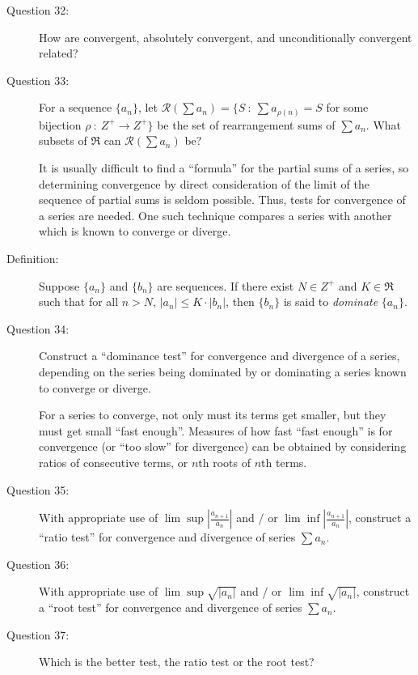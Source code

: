 \documentclass{article}
\begin{document}
\begin{description}
  \item[Question 32:] How are convergent, absolutely convergent, and unconditionally convergent related?

  \item[Question 33:] For a sequence $\{ a_n \}$, let $\mathcal{R} (\sum a_n) = \{ S\ :\ \sum a_{\rho (n)} = S$ for some bijection $\rho\ :\ Z^+ \to Z^+ \}$ be the set of rearrangement sums of $\sum a_n$. What subsets of $\Re$ can $\mathcal{R} (\sum a_n)$ be?

  \item[] It is usually difficult to find a ``formula'' for the partial sums of a series, so determining convergence by direct consideration of the limit of the sequence of partial sums is seldom possible. Thus, tests for convergence of a series are needed. One such technique compares a series with another which is known to converge or diverge.

  \item[Definition:] Suppose $\{ a_n \}$ and $\{ b_n \}$ are sequences. If there exist $N \in Z^+$ and $K \in \Re$ such that for all $n > N$, $|a_n| \leq K \cdot |b_n|$, then $\{ b_n \}$ is said to \emph{dominate} $\{ a_n \}$.

  \item[Question 34:] Construct a ``dominance test'' for convergence and divergence of a series, depending on the series being dominated by or dominating a series known to converge or diverge.

  \item[] For a series to converge, not only must its terms get smaller, but they must get small ``fast enough''. Measures of how fast ``fast enough'' is for convergence (or ``too slow'' for divergence) can be obtained by considering ratios of consecutive terms, or $n$th roots of $n$th terms.

  \item[Question 35:] With appropriate use of $\lim \sup \left| \frac{a_{n+1}}{a_n} \right|$ and / or $\lim \inf \left| \frac{a_{n+1}}{a_n} \right|$, construct a ``ratio test'' for convergence and divergence of series $\sum a_n$.

  \item[Question 36:] With appropriate use of $\lim \sup \sqrt{|a_n|}$ and / or $\lim \inf \sqrt{|a_n|}$, construct a ``root test'' for convergence and divergence of series $\sum a_n$.

  \item[Question 37:] Which is the better test, the ratio test or the root test?

\end{description}
\end{document}
